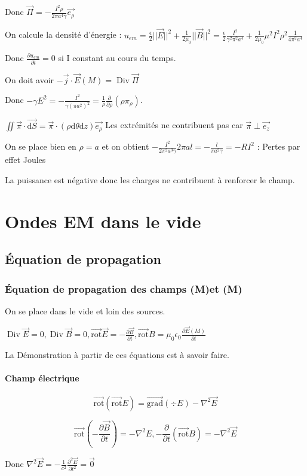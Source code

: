 \documentclass[french]{yLectureNote}
\renewcommand{\vec}{\overrightarrow}
\newcommand{\dd}{\mathrm{d}}
\newcommand{\norm}[1]{||\vec{#1}||}
\newcommand{\lap}{\nabla^2}
\newcommand{\E}{\vec{E}(M)}
\newcommand{\B}{\vec{B}(M)}
\DeclareMathOperator{\Div}{Div}
\newcommand{\rot}{\vec{\mathrm{rot}}}
\newcommand{\grad}{\vec{\mathrm{grad}}}
\begin{document}
Donc $\vec{\Pi} = - \frac{I^2 \rho}{2\pi a^4 \gamma}\vec{e_\rho}$

On calcule la densité d'énergie : $u_{em} = \frac{\epsilon}{2} \norm{E}^2 + \frac{1}{2\mu_0}\norm{B}^2 = \frac{\epsilon}{2}\frac{I^2}{\gamma^2\pi^2 a^4}+\frac{1}{2\mu_0}\mu^2I^2\rho^2\frac{1}{4\pi^2 a^4}$

Donc $\frac{\partial u_{em}}{\partial t}=0$ si I constant au cours du temps.

On doit avoir $-\vec{j}\cdot \E = \Div \vec{\Pi}$

Donc $-\gamma E^2 = -\frac{I^2}{\gamma (\pi a^2)^2} = \frac{1}{\rho} \frac{\partial}{\partial \rho}(\rho \pi_{\rho})$.

$\iint \vec{\pi}\cdot \vec{\dd S} =  \vec{\pi} \cdot (\rho\dd \theta \dd z)\vec{e_\rho}$ Les extrémités ne contribuent pas car $\vec{\pi}\perp \vec{e_z}$

On se place bien en $\rho=a$ et on obtient $-\frac{I^2}{2\pi^2 a^3 \gamma}2\pi al = -\frac{l}{\pi a^2 \gamma} = -R I^2$ : Pertes par effet Joules

La puissance est négative donc les charges ne contribuent à renforcer le champ.
\chapter{Ondes EM dans le vide}
\section{Équation de propagation}
\subsection{Équation de propagation des champs \E et \B}
On se place dans le vide et loin des sources.

$\Div \vec{E} = 0, \Div \vec{B} = 0, \rot \vec{E} = -\frac{\partial \vec{B}}{\partial t},\rot B = \mu_0 \epsilon_0 \frac{\partial \E}{\partial t}$

La Démonstration à partir de ces équations est à savoir faire.

\subsubsection{Champ électrique}
$$\rot(\rot E) = \grad(\div E)-\lap \vec{E}$$

$$\rot(-\frac{\partial \vec{B}}{\partial t}) = -\lap E, -\frac{\partial}{\partial t}(\rot B) = -\lap \vec{E}$$

Donc $ \lap \vec{E} = -\frac{1}{c^2}\frac{\partial^2 \vec{E}}{\partial t^2} = \vec{0}$
\end{document}
